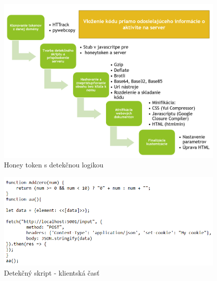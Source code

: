 \documentclass[conference, 11pt,slovak,a4paper,twoside]{IEEEtran}
\begin{document}
\begin{figure}[!t]  %
					\begin{center}
									\includegraphics[width=\linewidth]{fig/senderCodeToken.png}
									\caption{Honey token s detekčnou logikou}
									\label{senderCodeToken}
					\end{center}
\end{figure}

\begin{figure}[!t]  %
					\begin{center}
									\includegraphics[width=\linewidth]{fig/maskingClientCode.png}
									\caption{Detekčný skript - klientská časť}
									\label{maskingClientCode}
					\end{center}
\end{figure}
\end{document}
